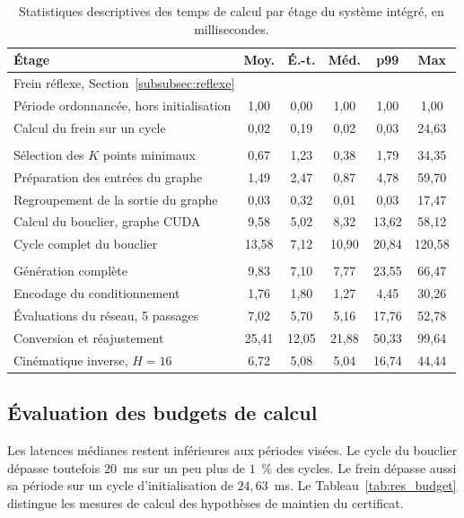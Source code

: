 \begin{table}[htbp]
\centering
\caption{Statistiques descriptives des temps de calcul par étage du système intégré, en millisecondes.}
\label{tab:stage_stats}
\footnotesize
\setlength{\tabcolsep}{4pt}
\begin{tabular}{lccccc}
\toprule
Étage & Moy. & É.-t. & Méd. & p99 & Max \\
\midrule
\multicolumn{6}{l}{Frein réflexe, Section~\ref{subsubsec:reflexe}} \\
Période ordonnancée, hors initialisation & 1,00 & 0,00 & 1,00 & 1,00 & 1,00 \\
Calcul du frein sur un cycle & 0,02 & 0,19 & 0,02 & 0,03 & 24,63 \\
\addlinespace
\multicolumn{6}{l}{Bouclier \acs{SDF}-\acs{CBF}, Sections~\ref{subsec:selection} à~\ref{subsec:commande}} \\
Sélection des $K$ points minimaux & 0,67 & 1,23 & 0,38 & 1,79 & 34,35 \\
Préparation des entrées du graphe & 1,49 & 2,47 & 0,87 & 4,78 & 59,70 \\
Regroupement de la sortie du graphe & 0,03 & 0,32 & 0,01 & 0,03 & 17,47 \\
Calcul du bouclier, graphe \ac{CUDA} & 9,58 & 5,02 & 8,32 & 13,62 & 58,12 \\
Cycle complet du bouclier & 13,58 & 7,12 & 10,90 & 20,84 & 120,58 \\
\addlinespace
\multicolumn{6}{l}{Chaîne de planification, Sections~\ref{sec:CFM} et~\ref{sec:Conversion}} \\
Génération complète & 9,83 & 7,10 & 7,77 & 23,55 & 66,47 \\
\quad Encodage du conditionnement & 1,76 & 1,80 & 1,27 & 4,45 & 30,26 \\
\quad Évaluations du réseau, 5 passages & 7,02 & 5,70 & 5,16 & 17,76 & 52,78 \\
Conversion et réajustement & 25,41 & 12,05 & 21,88 & 50,33 & 99,64 \\
\quad Cinématique inverse, $H=16$ & 6,72 & 5,08 & 5,04 & 16,74 & 44,44 \\
\bottomrule
\end{tabular}
\end{table}

\subsection{Évaluation des budgets de calcul}
Les latences médianes restent inférieures aux périodes visées. Le cycle du bouclier dépasse toutefois $20$~ms sur un peu plus de $1$~\% des cycles. Le frein dépasse aussi sa période sur un cycle d'initialisation de $24{,}63$~ms. Le Tableau~\ref{tab:res_budget} distingue les mesures de calcul des hypothèses de maintien du certificat.

